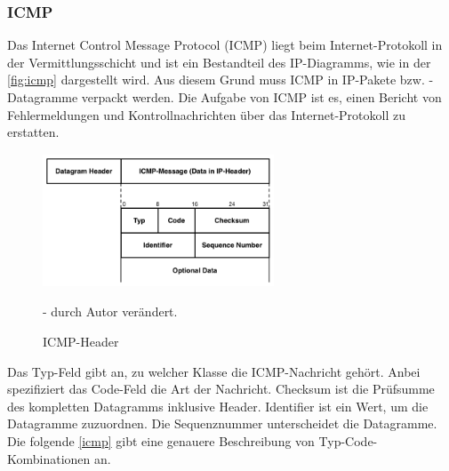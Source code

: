 \subsubsection{ICMP}

Das Internet Control Message Protocol (ICMP) liegt beim Internet-Protokoll in der Vermittlungsschicht und ist ein Bestandteil des IP-Diagramms, wie in der \autoref{fig:icmp} dargestellt wird. Aus diesem Grund muss ICMP in IP-Pakete bzw. -Datagramme verpackt werden. Die Aufgabe von ICMP ist es, einen Bericht von Fehlermeldungen und Kontrollnachrichten über das Internet-Protokoll zu erstatten. \smallskip \smallskip

\begin{figure}[htbp]
	\centering
		\includegraphics[width=260px,height=150px]{pictures/icmp.png}
	\caption[Internet Control Message Protocol]{ICMP-Header \cite{RFC:792}}\label{fig:icmp} - durch Autor verändert.
\end{figure}

Das Typ-Feld gibt an, zu welcher Klasse die ICMP-Nachricht gehört. Anbei spezifiziert das Code-Feld die Art der Nachricht. Checksum ist die Prüfsumme des kompletten Datagramms inklusive Header. Identifier ist ein Wert, um die Datagramme zuzuordnen. Die Sequenznummer unterscheidet die Datagramme. Die folgende \autoref{icmp} gibt eine genauere Beschreibung von Typ-Code-Kombinationen an. 

